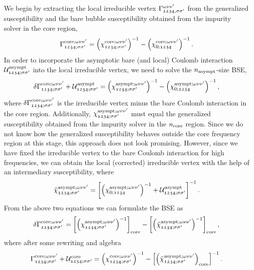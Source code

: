 \documentclass[../../main.tex]{subfiles}
\begin{document}
We begin by extracting the local irreducible vertex $\Gamma_{\mathfrak{1234},\ss'}^{\omega\nu\nu'}$ from the generalized susceptibility and the bare bubble susceptibility obtained from the impurity solver in the core region,
\begin{align}
	\Gamma_{\mathfrak{1234};\ss'}^{\core;\omega\nu\nu'}=\left (\chi_{\mathfrak{1234};\ss'}^{\core;\omega\nu\nu'}\right )^{-1}-\left (\chi_{0;\mathfrak{1234}}^{\core;\omega\nu\nu'}\right )^{-1}.
\end{align}
In order to incorporate the asymptotic bare (and local) Coulomb interaction $\mathcal{U}_{\mathfrak{1234};\ss'}^{\asympt}$ into the local irreducible vertex, we need to solve the $n_{\asympt}$-size BSE,
\begin{align}
	\delta\Gamma_{\mathfrak{1234};\ss'}^{\core;\omega\nu\nu'}+\mathcal{U}_{\mathfrak{1234};\ss'}^{\asympt}=\left (\chi_{\mathfrak{1234};\ss'}^{\asympt;\omega\nu\nu'}\right )^{-1}-\left (\chi_{0;\mathfrak{1234}}^{\asympt;\omega\nu\nu'}\right )^{-1},
\end{align}
where $\delta\Gamma_{\mathfrak{1234};\ss'}^{\core;\omega\nu\nu'}$ is the irreducible vertex minus the bare Coulomb interaction in the core region. Additionally, $\chi_{\mathfrak{1234};\ss'}^{\asympt;\omega\nu\nu'}$ must equal the generalized susceptibility obtained from the impurity solver in the $n_{\core}$ region. Since we do not know how the generalized susceptibility behaves outside the core frequency region at this stage, this approach does not look promising. However, since we have fixed the irreducible vertex to the bare Coulomb interaction for high frequencies, we can obtain the local (corrected) irreducible vertex with the help of an intermediary susceptibility, where
\begin{align}
	\tilde\chi_{\mathfrak{1234};\ss'}^{\asympt;\omega\nu\nu'} = \left [\left (\chi_{0;\mathfrak{1234}}^{\asympt;\omega\nu\nu'}\right )^{-1}+\mathcal{U}_{\mathfrak{1234};\ss'}^{\asympt}\right ]^{-1}.
\end{align}
From the above two equations we can formulate the BSE as
\begin{align}
	\delta\Gamma_{\mathfrak{1234};\ss'}^{\core;\omega\nu\nu'}=\left [\left (\chi_{\mathfrak{1234};\ss'}^{\asympt;\omega\nu\nu'}\right )^{-1}\right ]_{\core}-\left [\left (\tilde\chi_{\mathfrak{1234};\ss'}^{\asympt;\omega\nu\nu'}\right )^{-1}\right ]_{\core},
\end{align}
where after some rewriting and algebra \cite{Kitatani2022}
\begin{align}
	\Gamma_{\mathfrak{1234};\ss'}^{\core;\omega\nu\nu'}+\mathcal{U}_{\mathfrak{1234};\ss'}^{\core}=\left (\chi_{\mathfrak{1234};\ss'}^{\core;\omega\nu\nu'}\right )^{-1}-\left [\left (\tilde\chi_{\mathfrak{1234};\ss'}^{\asympt;\omega\nu\nu'}\right )_{\core}\right ]^{-1}.
\end{align}
\end{document}
